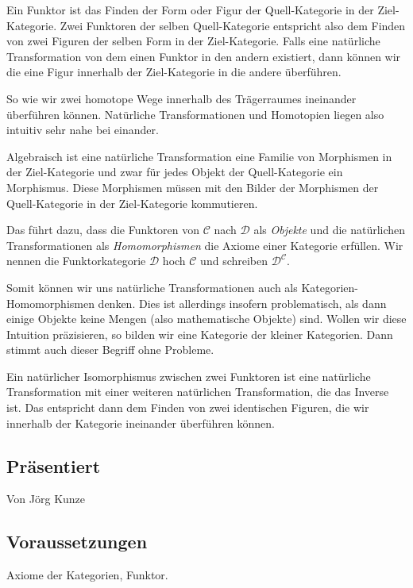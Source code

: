 \documentclass[a4paper]{amsart}
\theoremstyle{definition}
\begin{document}
Ein Funktor ist das Finden der Form oder Figur der Quell-Kategorie in der Ziel-Kategorie. Zwei Funktoren der selben Quell-Kategorie entspricht also dem Finden von zwei Figuren der selben Form in der Ziel-Kategorie. Falls eine natürliche Transformation von dem einen Funktor in den andern existiert, dann können wir die eine Figur innerhalb der Ziel-Kategorie in die andere überführen.

So wie wir zwei homotope Wege innerhalb des Trägerraumes ineinander überführen können. Natürliche Transformationen und Homotopien liegen also intuitiv sehr nahe bei einander.

Algebraisch ist eine natürliche Transformation eine Familie von Morphismen in der Ziel-Kategorie und zwar für jedes Objekt der Quell-Kategorie ein Morphismus. Diese Morphismen müssen mit den Bilder der Morphismen der Quell-Kategorie in der Ziel-Kategorie kommutieren. 

Das führt dazu, dass die Funktoren von $\mathcal C$ nach $\mathcal D$ als \emph{Objekte} und die natürlichen Transformationen als \emph{Homomorphismen} die Axiome einer Kategorie erfüllen. Wir nennen die Funktorkategorie $\mathcal D$ hoch $\mathcal C$ und schreiben $\mathcal D ^ {\mathcal C}$.

Somit können wir uns natürliche Transformationen auch als Kategorien-Homomorphismen denken. Dies ist allerdings insofern problematisch, als dann einige Objekte keine Mengen (also mathematische Objekte) sind. Wollen wir diese Intuition präzisieren, so bilden wir eine Kategorie der kleiner Kategorien. Dann stimmt auch dieser Begriff ohne Probleme.

Ein natürlicher Isomorphismus zwischen zwei Funktoren ist eine natürliche Transformation mit einer weiteren natürlichen Transformation, die das Inverse ist. Das entspricht dann dem Finden von zwei identischen Figuren, die wir innerhalb der Kategorie ineinander überführen können.

\subsection*{Präsentiert}
Von Jörg Kunze

\subsection*{Voraussetzungen}
Axiome der Kategorien, Funktor.
\end{document}
